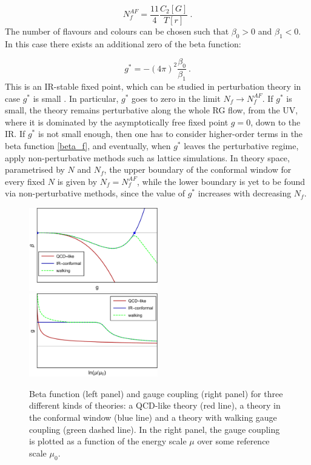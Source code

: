 \begin{equation}
N_f^{AF} = \frac{11}{4} \frac{C_2[G]}{T[r]} \: .
\end{equation}
%
The number of flavours and colours can be chosen such that $\beta_0>0$ and $\beta_1<0$. In this case there exists an additional zero of the beta function:

\begin{equation}
g^* = -(4 \pi)^2 \frac{\beta_0}{\beta_1} \: .
\end{equation}
%
This is an IR-stable fixed point, which can be studied in perturbation theory in case $g^*$ is small \cite{Banks:1981nn}. In particular, $g^*$ goes to zero in the limit $N_f \to N_f^{AF}$. If $g^*$ is small, the theory remains perturbative along the whole RG flow, from the UV, where it is dominated by the asymptotically free fixed point $g=0$, down to the IR. If $g^*$ is not small enough, then one has to consider higher-order terms in the beta function \ref{beta_f}, and eventually, when $g^*$ leaves the perturbative regime, apply non-perturbative methods such as lattice simulations. In theory space, parametrised by $N$ and $N_f$, the upper boundary of the conformal window for every fixed $N$ is given by $N_f = N_f^{AF}$, while the lower boundary is yet to be found via non-perturbative methods, since the value of $g^*$ increases with decreasing $N_f$.


\begin{figure}[h!]
\includegraphics[width=0.5\textwidth]{pics/beta_walking}~~~
\includegraphics[width=0.5\textwidth]{pics/g_walking}
\caption{Beta function (left panel) and gauge coupling (right panel) for three different kinds of theories: a QCD-like theory (red line), a theory in the conformal window (blue line) and a theory with walking gauge coupling (green dashed line). In the right panel, the gauge coupling is plotted as a function of the energy scale $\mu$ over some reference scale $\mu_0$.} 
\label{walking}
\end{figure}


